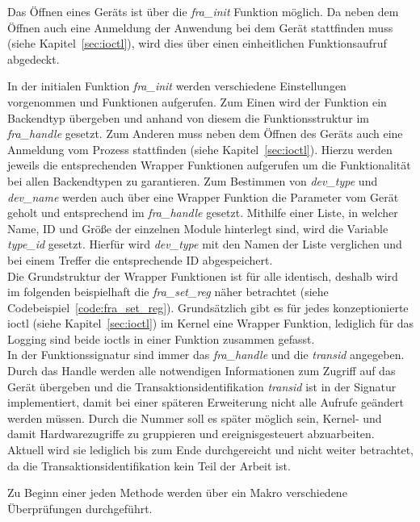 Das Öffnen eines Geräts ist über die \textit{fra\_init} Funktion möglich. Da neben dem Öffnen auch eine Anmeldung der Anwendung bei dem Gerät stattfinden muss (siehe Kapitel~\ref{sec:ioctl}), wird dies über einen einheitlichen Funktionsaufruf abgedeckt. 

In der initialen Funktion \textit{fra\_init} werden verschiedene Einstellungen vorgenommen und Funktionen aufgerufen. Zum Einen wird der Funktion ein Backendtyp übergeben und anhand von diesem die Funktionsstruktur im \textit{fra\_handle} gesetzt.
Zum Anderen muss neben dem Öffnen des Geräts auch eine Anmeldung vom Prozess stattfinden (siehe Kapitel~\ref{sec:ioctl}). Hierzu werden jeweils die entsprechenden Wrapper Funktionen aufgerufen um die Funktionalität bei allen Backendtypen zu garantieren. Zum Bestimmen von \textit{dev\_type} und \textit{dev\_name} werden auch über eine Wrapper Funktion die Parameter vom Gerät geholt und entsprechend im \textit{fra\_handle} gesetzt. Mithilfe einer Liste, in welcher Name, ID und Größe der einzelnen Module hinterlegt sind, wird die Variable \textit{type\_id} gesetzt. Hierfür wird \textit{dev\_type} mit den Namen der Liste verglichen und bei einem Treffer die entsprechende ID abgespeichert.\\


Die Grundstruktur der Wrapper Funktionen ist für alle identisch, deshalb wird im folgenden beispielhaft die \textit{fra\_set\_reg} näher betrachtet (siehe Codebeispiel~\ref{code:fra_set_reg}). Grundsätzlich gibt es für jedes konzeptionierte \ac{ioctl} (siehe Kapitel~\ref{sec:ioctl}) im Kernel eine Wrapper Funktion, lediglich für das Logging sind beide \ac{ioctl}s in einer Funktion zusammen gefasst.\\ 


In der Funktionssignatur sind immer das \textit{fra\_handle} und die \textit{transid} angegeben. Durch das Handle werden alle notwendigen Informationen zum Zugriff auf das Gerät übergeben und die Transaktionsidentifikation \textit{transid} ist in der Signatur implementiert, damit bei einer späteren Erweiterung nicht alle Aufrufe geändert werden müssen. Durch die Nummer soll es später möglich sein, Kernel- und damit Hardwarezugriffe zu gruppieren und ereignisgesteuert abzuarbeiten. Aktuell wird sie lediglich bis zum Ende durchgereicht und nicht weiter betrachtet, da die Transaktionsidentifikation kein Teil der Arbeit ist. 


Zu Beginn einer jeden Methode werden über ein Makro verschiedene Überprüfungen durchgeführt. 

